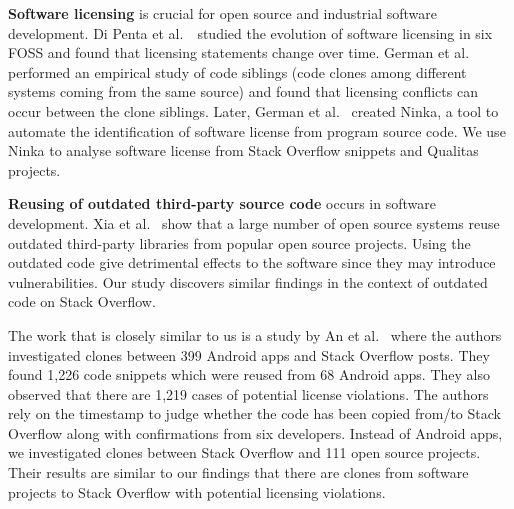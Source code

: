 \documentclass[sigconf,review, anonymous]{acmart}
\begin{document}
\textbf{Software licensing} is crucial for open source and industrial software development. Di Penta et al.~\cite{DiPenta2010}~studied the evolution of software licensing in six FOSS and found that licensing statements change over time. German et al.~\cite{German2009} performed an empirical study of code siblings (code clones among different systems coming from the same source) and found that licensing conflicts can occur between the clone siblings. Later, German et al.~\cite{German2010} created Ninka, a tool to automate the identification of software license from program source code. We use Ninka to analyse software license from Stack Overflow snippets and Qualitas projects. 

\textbf{Reusing of outdated third-party source code} occurs in software development. Xia et al.~\cite{Xia2014} show that a large number of open source systems reuse outdated third-party libraries from popular open source projects. Using the outdated code give detrimental effects to the software since they may introduce vulnerabilities. Our study discovers similar findings in the context of outdated code on Stack Overflow.

The work that is closely similar to us is a study by An et al.~\cite{An2017} where the authors investigated clones between 399 Android apps and Stack Overflow posts. They found 1,226 code snippets which were reused from 68 Android apps. They also observed that there are 1,219 cases of potential license violations. The authors rely on the timestamp to judge whether the code has been copied from/to Stack Overflow along with confirmations from six developers. Instead of Android apps, we investigated clones between Stack Overflow and 111 open source projects. Their results are similar to our findings that there are clones from software projects to Stack Overflow with potential licensing violations. %
\end{document}
